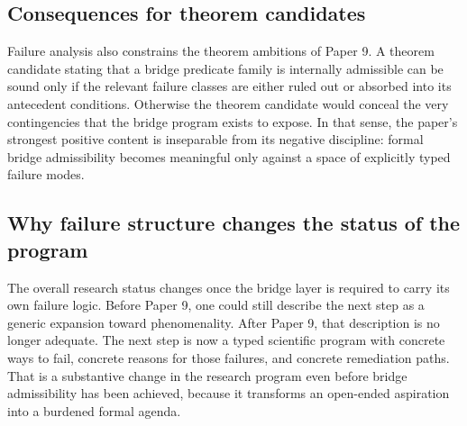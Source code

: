 \documentclass[11pt,a4paper]{article}
\theoremstyle{definition}
\begin{document}
\subsection{Consequences for theorem candidates}
Failure analysis also constrains the theorem ambitions of Paper 9. A theorem candidate stating that a bridge predicate family is internally admissible can be sound only if the relevant failure classes are either ruled out or absorbed into its antecedent conditions. Otherwise the theorem candidate would conceal the very contingencies that the bridge program exists to expose. In that sense, the paper's strongest positive content is inseparable from its negative discipline: formal bridge admissibility becomes meaningful only against a space of explicitly typed failure modes.

\subsection{Why failure structure changes the status of the program}
The overall research status changes once the bridge layer is required to carry its own failure logic. Before Paper 9, one could still describe the next step as a generic expansion toward phenomenality. After Paper 9, that description is no longer adequate. The next step is now a typed scientific program with concrete ways to fail, concrete reasons for those failures, and concrete remediation paths. That is a substantive change in the research program even before bridge admissibility has been achieved, because it transforms an open-ended aspiration into a burdened formal agenda.
\end{document}
